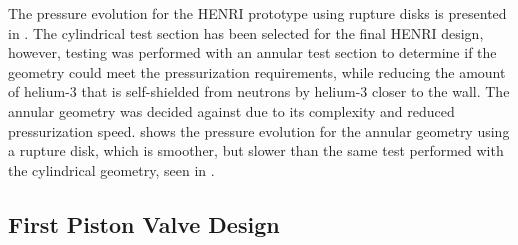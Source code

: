The pressure evolution for the HENRI prototype using rupture disks is presented in . The cylindrical test section has been selected for the final HENRI design, however, testing was performed with an annular test section to determine if the geometry could meet the pressurization requirements, while reducing the amount of helium-3 that is self-shielded from neutrons by helium-3 closer to the wall. The annular geometry was decided against due to its complexity and reduced pressurization speed.  shows the pressure evolution for the annular geometry using a rupture disk, which is smoother, but slower than the same test performed with the cylindrical geometry, seen in .

\subsection{First Piston Valve Design}

